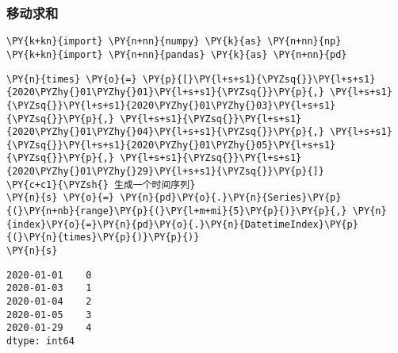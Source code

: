     \hypertarget{ux79fbux52a8ux6c42ux548c}{%
\subsubsection{移动求和}\label{ux79fbux52a8ux6c42ux548c}}

    \begin{tcolorbox}[breakable, size=fbox, boxrule=1pt, pad at break*=1mm,colback=cellbackground, colframe=cellborder]
\begin{Verbatim}[commandchars=\\\{\}]
\PY{k+kn}{import} \PY{n+nn}{numpy} \PY{k}{as} \PY{n+nn}{np}
\PY{k+kn}{import} \PY{n+nn}{pandas} \PY{k}{as} \PY{n+nn}{pd}
\end{Verbatim}
\end{tcolorbox}

    \begin{tcolorbox}[breakable, size=fbox, boxrule=1pt, pad at break*=1mm,colback=cellbackground, colframe=cellborder]
\begin{Verbatim}[commandchars=\\\{\}]
\PY{n}{times} \PY{o}{=} \PY{p}{[}\PY{l+s+s1}{\PYZsq{}}\PY{l+s+s1}{2020\PYZhy{}01\PYZhy{}01}\PY{l+s+s1}{\PYZsq{}}\PY{p}{,} \PY{l+s+s1}{\PYZsq{}}\PY{l+s+s1}{2020\PYZhy{}01\PYZhy{}03}\PY{l+s+s1}{\PYZsq{}}\PY{p}{,} \PY{l+s+s1}{\PYZsq{}}\PY{l+s+s1}{2020\PYZhy{}01\PYZhy{}04}\PY{l+s+s1}{\PYZsq{}}\PY{p}{,} \PY{l+s+s1}{\PYZsq{}}\PY{l+s+s1}{2020\PYZhy{}01\PYZhy{}05}\PY{l+s+s1}{\PYZsq{}}\PY{p}{,} \PY{l+s+s1}{\PYZsq{}}\PY{l+s+s1}{2020\PYZhy{}01\PYZhy{}29}\PY{l+s+s1}{\PYZsq{}}\PY{p}{]}
\PY{c+c1}{\PYZsh{} 生成一个时间序列}
\PY{n}{s} \PY{o}{=} \PY{n}{pd}\PY{o}{.}\PY{n}{Series}\PY{p}{(}\PY{n+nb}{range}\PY{p}{(}\PY{l+m+mi}{5}\PY{p}{)}\PY{p}{,} \PY{n}{index}\PY{o}{=}\PY{n}{pd}\PY{o}{.}\PY{n}{DatetimeIndex}\PY{p}{(}\PY{n}{times}\PY{p}{)}\PY{p}{)}
\PY{n}{s}
\end{Verbatim}
\end{tcolorbox}

            \begin{tcolorbox}[breakable, size=fbox, boxrule=.5pt, pad at break*=1mm, opacityfill=0]
\begin{Verbatim}[commandchars=\\\{\}]
2020-01-01    0
2020-01-03    1
2020-01-04    2
2020-01-05    3
2020-01-29    4
dtype: int64
\end{Verbatim}
\end{tcolorbox}
        
